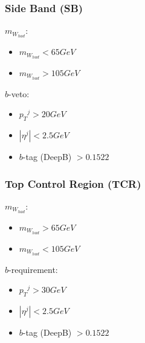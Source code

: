 \documentclass{beamer}
\begin{document}
\begin{frame}
    \frametitle{Side Band (SB)}
    ${m_{W_{had}}}$:
    \begin{itemize}
        \item ${m_{W_{had}}} < 65 GeV$
        \item ${m_{W_{had}}} > 105 GeV$
    \end{itemize}
    $b$-veto:
    \begin{itemize}
       \item ${p_{T}}^{j} > 20 GeV$ 
       \item $|{\eta}^{j}| < 2.5 GeV$
       \item $b$-tag (DeepB) $>  0.1522$  
    \end{itemize}
\end{frame}

\begin{frame}
    \frametitle{Top Control Region (TCR)}
    ${m_{W_{had}}}$:
    \begin{itemize}
        \item ${m_{W_{had}}} > 65 GeV$
        \item ${m_{W_{had}}} < 105 GeV$
    \end{itemize}
    $b$-requirement:
    \begin{itemize}
       \item ${p_{T}}^{j} > 30 GeV$ 
       \item $|{\eta}^{j}| < 2.5 GeV$
       \item $b$-tag (DeepB) $>  0.1522$  
    \end{itemize}
\end{frame}




\end{document}
